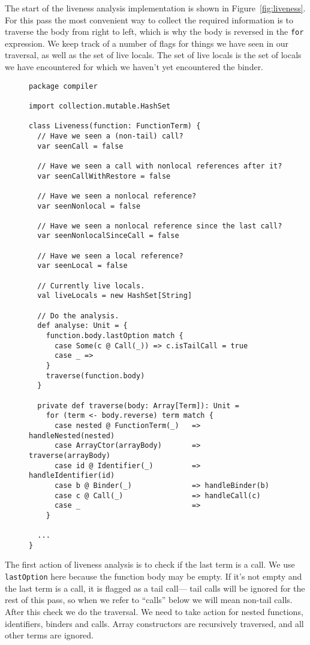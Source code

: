 The start of the liveness analysis implementation
is shown in Figure~\ref{fig:liveness}.
For this pass the most convenient way to collect the required information
is to traverse the body from right to left,
which is why the body is reversed in the \verb!for! expression.
We keep track of a number of flags for things we have seen in our traversal,
as well as the set of live locals.
The set of live locals is the set of locals we have encountered
for which we haven't yet encountered the binder.

\begin{figure}
\begin{verbatim}
package compiler

import collection.mutable.HashSet

class Liveness(function: FunctionTerm) {
  // Have we seen a (non-tail) call?
  var seenCall = false

  // Have we seen a call with nonlocal references after it?
  var seenCallWithRestore = false

  // Have we seen a nonlocal reference?
  var seenNonlocal = false

  // Have we seen a nonlocal reference since the last call?
  var seenNonlocalSinceCall = false

  // Have we seen a local reference?
  var seenLocal = false

  // Currently live locals.
  val liveLocals = new HashSet[String]

  // Do the analysis.
  def analyse: Unit = {
    function.body.lastOption match {
      case Some(c @ Call(_)) => c.isTailCall = true
      case _ =>
    }
    traverse(function.body)
  }

  private def traverse(body: Array[Term]): Unit =
    for (term <- body.reverse) term match {
      case nested @ FunctionTerm(_)   => handleNested(nested)
      case ArrayCtor(arrayBody)       => traverse(arrayBody)
      case id @ Identifier(_)         => handleIdentifier(id)
      case b @ Binder(_)              => handleBinder(b)
      case c @ Call(_)                => handleCall(c)
      case _                          =>
    }

  ...
}
\end{verbatim}
\getcaption
\end{figure}

The first action of liveness analysis is to check if the last term is a call.
We use \verb!lastOption! here because the function body may be empty.
If it's not empty and the last term is a call,
it is flagged as a tail call---%
tail calls will be ignored for the rest of this pass,
so when we refer to ``calls'' below we will mean non-tail calls.
After this check we do the traversal.
We need to take action for nested functions, identifiers, binders and calls.
Array constructors are recursively traversed,
and all other terms are ignored.

